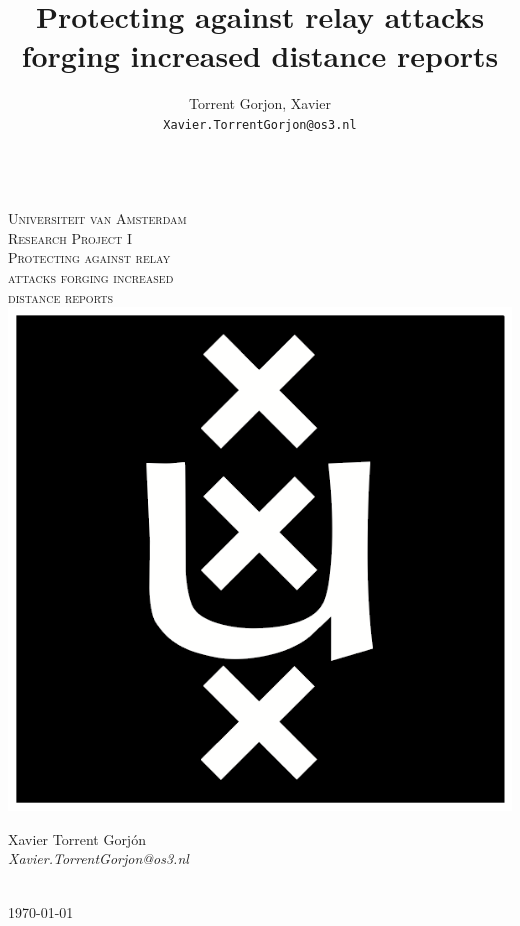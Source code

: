 \documentclass{article}
\author{
  Torrent Gorjon, Xavier\\
  \texttt{Xavier.TorrentGorjon@os3.nl}
}
\title{Protecting against relay attacks forging increased distance reports}
\begin{document}
\begin{titlepage}
\center
\textsc{}\\[1cm]
\textsc{\LARGE Universiteit van Amsterdam}\\[1.5cm]

\textsc{\Large Research Project I}\\[0.5cm]

\textsc{\Huge Protecting against relay\\[0cm] attacks forging increased\\[0.5cm] distance reports}\\[1.5cm]

\includegraphics[scale=1]{images/uva.png}\\[1cm]

\begin{minipage}{0.5 \textwidth}
\begin{center} \large
Xavier Torrent Gorj\'{o}n\\
\emph{Xavier.TorrentGorjon@os3.nl}\\[0.5cm]
\end{center}
\end{minipage}\\[2cm]
{\large \today} 


\end{titlepage}


\newpage
\end{document}
